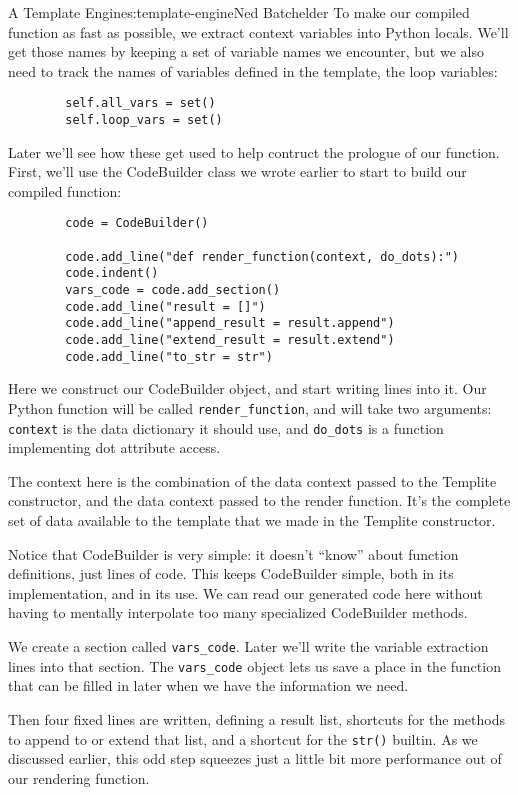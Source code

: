 \begin{aosachapter}{A Template Engine}{s:template-engine}{Ned Batchelder}
To make our compiled function as fast as possible, we extract context
variables into Python locals. We'll get those names by keeping a set of
variable names we encounter, but we also need to track the names of
variables defined in the template, the loop variables:

\begin{verbatim}
        self.all_vars = set()
        self.loop_vars = set()
\end{verbatim}

Later we'll see how these get used to help contruct the prologue of our
function. First, we'll use the CodeBuilder class we wrote earlier to
start to build our compiled function:

\begin{verbatim}
        code = CodeBuilder()

        code.add_line("def render_function(context, do_dots):")
        code.indent()
        vars_code = code.add_section()
        code.add_line("result = []")
        code.add_line("append_result = result.append")
        code.add_line("extend_result = result.extend")
        code.add_line("to_str = str")
\end{verbatim}

Here we construct our CodeBuilder object, and start writing lines into
it. Our Python function will be called \texttt{render\_function}, and
will take two arguments: \texttt{context} is the data dictionary it
should use, and \texttt{do\_dots} is a function implementing dot
attribute access.

The context here is the combination of the data context passed to the
Templite constructor, and the data context passed to the render
function. It's the complete set of data available to the template that
we made in the Templite constructor.

Notice that CodeBuilder is very simple: it doesn't ``know'' about
function definitions, just lines of code. This keeps CodeBuilder simple,
both in its implementation, and in its use. We can read our generated
code here without having to mentally interpolate too many specialized
CodeBuilder methods.

We create a section called \texttt{vars\_code}. Later we'll write the
variable extraction lines into that section. The \texttt{vars\_code}
object lets us save a place in the function that can be filled in later
when we have the information we need.

Then four fixed lines are written, defining a result list, shortcuts for
the methods to append to or extend that list, and a shortcut for the
\texttt{str()} builtin. As we discussed earlier, this odd step squeezes
just a little bit more performance out of our rendering function.


\end{aosachapter}

